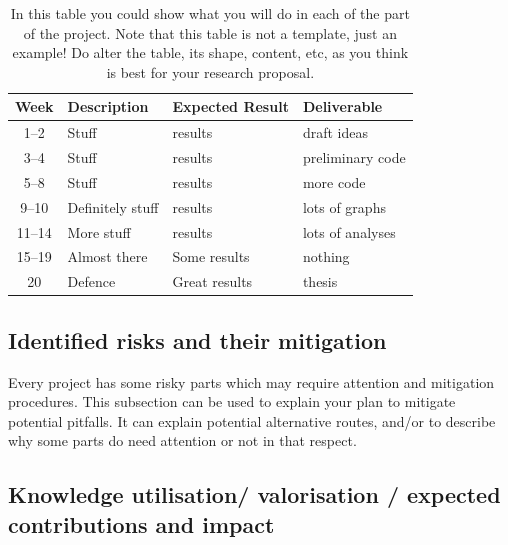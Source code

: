 \documentclass{article}
\begin{document}
\begin{table}[htp]
  \caption{In this table you could show what you will do in each of the part of the project. Note that this table is not a template, just an example! Do alter the table, its shape, content, etc, as you think is best for your research proposal.}\label{tab1}
  \begin{center}
    \begin{tabular}{c|l|l|l}
      Week   & Description      & Expected Result & Deliverable      \\
      \hline
      1--2   & Stuff            & results         & draft ideas      \\
      3--4   & Stuff            & results         & preliminary code \\
      5--8   & Stuff            & results         & more code        \\
      9--10  & Definitely stuff & results         & lots of graphs   \\
      11--14 & More stuff       & results         & lots of analyses \\
      15--19 & Almost there     & Some results    & nothing          \\
      20     & Defence          & Great results   & thesis           \\
      \hline
    \end{tabular}
  \end{center}
\end{table}

\subsection{Identified risks and their mitigation}

Every project has some risky parts which may require attention and mitigation procedures. This subsection can be used to explain your plan to mitigate potential pitfalls. It can explain potential alternative routes, and/or to describe why some parts do need attention or not in that respect.

\subsection{Knowledge utilisation/ valorisation / expected contributions and impact}
\end{document}
